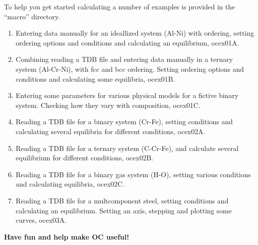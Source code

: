 \documentclass[12pt]{article}
\begin{document}
To help you get started calculating a number of examples is
provided in the ``macro'' directory.

\begin{enumerate}
\item Entering data manually for an ideallized system (Al-Ni) with
ordering, setting ordering options and conditions and calculating an
equilibrium, ocex01A.

\item Combining reading a TDB file and entering data manually in a
ternary system (Al-Cr-Ni), with fcc and bcc ordering.  Setting
ordering options and conditions and calculating some equilibria,
ocex01B.

\item Entering some parameters for various physical models for a
fictive binary system.  Checking how they vary with composition,
ocex01C.

\item Reading a TDB file for a binary system (Cr-Fe), setting
conditions and calculating several equilibria for different
conditions, ocex02A.

\item Reading a TDB file for a ternary system (C-Cr-Fe), and calculate
several equilibrium for different conditions, ocex02B.

\item Reading a TDB file for a binary gas system (H-O), setting 
various conditions and calculating equilibria, ocex02C.

\item Reading a TDB file for a multcomponent steel, setting conditions
and calculating an equilibrium.  Setting an axis, stepping and
plotting some curves, ocex03A.
\end{enumerate}

{\large \bf Have fun and help make OC useful!}
\end{document}

